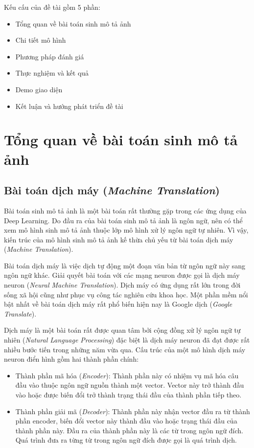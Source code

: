 \documentclass[14pt, a4paper]{article}
\numberwithin{equation}{section}
\numberwithin{algorithm}{section}
\numberwithin{figure}{section}
\numberwithin{table}{section}
\numberwithin{dl}{section}
\numberwithin{md}{section}
\numberwithin{bd}{section}
\numberwithin{dn}{section}
\numberwithin{hq}{section}
\begin{document}
    Kếu cấu của đề tài gồm 5 phần:

    \begin{itemize}
        \item Tổng quan về bài toán sinh mô tả ảnh
        \item Chi tiết mô hình
        \item Phương pháp đánh giá
        \item Thực nghiệm và kết quả
        \item Demo giao diện
        \item Kết luận và hướng phát triển đề tài
    \end{itemize}

    \newpage

    \section{Tổng quan về bài toán sinh mô tả ảnh}

    \subsection{Bài toán dịch máy (\textit{Machine Translation})} \label{Machine-Translation}
    Bài toán sinh mô tả ảnh là một bài toán rất thường gặp trong các ứng dụng của Deep Learning.
    Do đầu ra của bài toán sinh mô tả ảnh là ngôn ngữ, nên có thể xem mô hình sinh mô tả ảnh thuộc lớp mô hình xử lý ngôn ngữ tự nhiên.
    Vì vậy, kiến trúc của mô hình sinh mô tả ảnh kế thừa chủ yếu từ bài toán dịch máy (\textit{Machine Translation}).
    
    Bài toán dịch máy là việc dịch tự động một đoạn văn bản từ ngôn ngữ này sang ngôn ngữ khác.
    Giải quyết bài toán với các mạng neuron được gọi là dịch máy neuron (\textit{Neural Machine Translation}).
    Dịch máy có ứng dụng rất lớn trong đời sống xã hội cũng như phục vụ công tác nghiên cứu khoa học. 
    Một phần mềm nổi bật nhất về bài toán dịch máy rất phổ biến hiện nay là Google dịch (\textit{Google Translate}).
    
    Dịch máy là một bài toán rất được quan tâm bởi cộng đồng xử lý ngôn ngữ tự nhiên (\textit{Natural Language Processing}) đặc biệt là dịch máy neuron đã đạt được rất nhiều bước tiến trong những năm vừa qua.
    Cấu trúc của một mô hình dịch máy neuron điển hình gồm hai thành phần chính:

    \begin{itemize}
        \item Thành phần mã hóa (\textit{Encoder}): Thành phần này có nhiệm vụ mã hóa câu đầu vào thuộc ngôn ngữ nguồn thành một vector. Vector này trở thành đầu vào hoặc được biến đổi trở thành trạng thái đầu của thành phần tiếp theo.
        \item Thành phần giải mã (\textit{Decoder}): Thành phần này nhận vector đầu ra từ thành phần encoder, biến đổi vector này thành đầu vào hoặc trạng thái đầu của thành phần này. Đầu ra của thành phần này là các từ trong ngôn ngữ đích. Quá trình đưa ra từng từ trong ngôn ngữ đích được gọi là quá trình dịch.
    \end{itemize}
\end{document}
